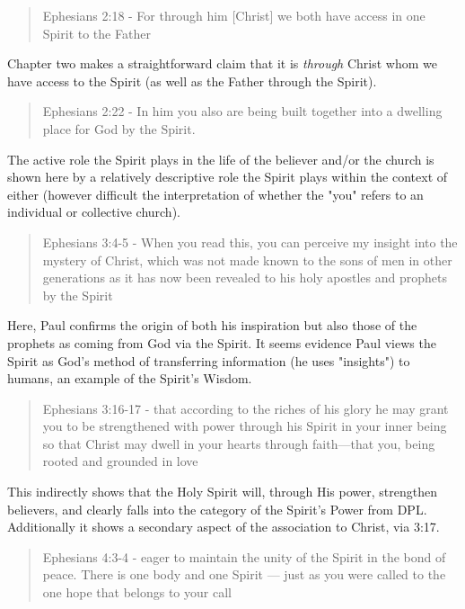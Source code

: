 \documentclass[12pt]{turabian-researchpaper}
\begin{document}
\begin{quote}
Ephesians 2:18 - For through him [Christ] we both have access in one Spirit to the Father
\end{quote}

\noindent Chapter two makes a straightforward claim that it is \textit{through} Christ whom we have access to the Spirit (as well as the Father through the Spirit). 

\begin{quote}
Ephesians 2:22 - In him you also are being built together into a dwelling place for God by the Spirit.
\end{quote}

\noindent The active role the Spirit plays in the life of the believer and/or the church is shown here by a relatively descriptive role the Spirit plays within the context of either (however difficult the interpretation of whether the "you" refers to an individual or collective church). 

\begin{quote}
Ephesians 3:4-5 - When you read this, you can perceive my insight into the mystery of Christ,  which was not made known to the sons of men in other generations as it has now been revealed to his holy apostles and prophets by the Spirit
\end{quote}

\noindent Here, Paul confirms the origin of both his inspiration but also those of the prophets as coming from God via the Spirit. It seems evidence Paul views the Spirit as God's method of transferring information (he uses "insights") to humans, an example of the Spirit's Wisdom.

\begin{quote}
Ephesians 3:16-17 - that according to the riches of his glory he may grant you to be strengthened with power through his Spirit in your inner being so that Christ may dwell in your hearts through faith—that you, being rooted and grounded in love
\end{quote}

\noindent This indirectly shows that the Holy Spirit will, through His power, strengthen believers, and clearly falls into the category of the Spirit's Power from DPL.  Additionally it shows a secondary aspect of the association to Christ, via 3:17.

\begin{quote}
Ephesians 4:3-4 - eager to maintain the unity of the Spirit in the bond of peace. There is one body and one Spirit — just as you were called to the one hope that belongs to your call
\end{quote}
\end{document}
